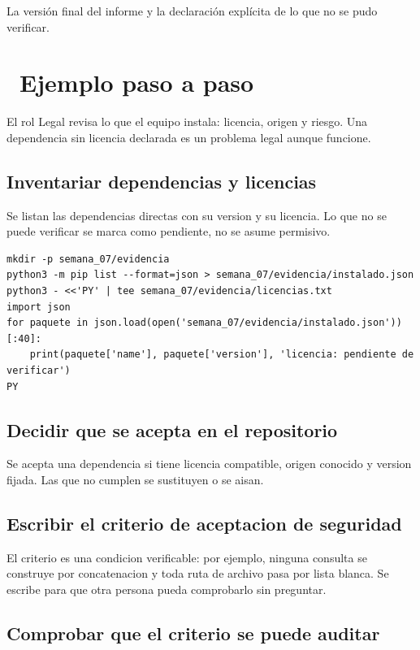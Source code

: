 \documentclass[11pt,a4paper]{article}
\newcommand{\iconotexto}[2]{\textcolor{cyanNeon}{\faIcon{#1}}~#2}
\begin{document}
La versión final del informe y la declaración explícita de lo que no se pudo verificar.

\section{\iconotexto{list-ol}{Ejemplo paso a paso}}

El rol Legal revisa lo que el equipo instala: licencia, origen y riesgo. Una dependencia sin licencia declarada es un problema legal aunque funcione.

\subsection{Inventariar dependencias y licencias}

Se listan las dependencias directas con su version y su licencia. Lo que no se puede verificar se marca como pendiente, no se asume permisivo.

\begin{lstlisting}[style=estiloCodigo]
mkdir -p semana_07/evidencia
python3 -m pip list --format=json > semana_07/evidencia/instalado.json
python3 - <<'PY' | tee semana_07/evidencia/licencias.txt
import json
for paquete in json.load(open('semana_07/evidencia/instalado.json'))[:40]:
    print(paquete['name'], paquete['version'], 'licencia: pendiente de verificar')
PY
\end{lstlisting}

\subsection{Decidir que se acepta en el repositorio}

Se acepta una dependencia si tiene licencia compatible, origen conocido y version fijada. Las que no cumplen se sustituyen o se aisan.

\subsection{Escribir el criterio de aceptacion de seguridad}

El criterio es una condicion verificable: por ejemplo, ninguna consulta se construye por concatenacion y toda ruta de archivo pasa por lista blanca. Se escribe para que otra persona pueda comprobarlo sin preguntar.

\subsection{Comprobar que el criterio se puede auditar}
\end{document}
